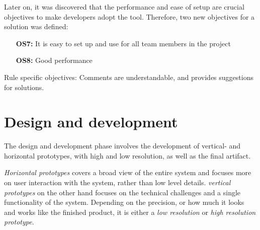 \documentclass{report}
\begin{document}
Later on, it was discovered that the performance and ease of setup are crucial objectives to make developers adopt the tool. Therefore, two new objectives for a solution was defined:
\begin{itemize}
     \item [\textbf{OS7:}] It is easy to set up and use for all team members in the project
    \item [\textbf{OS8:}] Good performance
\end{itemize}






Rule specific objectives: 
Comments are understandable, and provides suggestions for solutions.

\section{Design and development}

The design and development phase involves the development of vertical- and horizontal prototypes, with high and low resolution, as well as the final artifact. 

\textit{Horizontal prototypes} covers a broad view of the entire system and focuses more on user interaction with the system, rather than low level details. \textit{vertical prototypes} on the other hand focuses on the technical challenges and a single functionality of the system. Depending on the precision, or how much it looks and works like the finished product, it is either a \textit{low resolution} or \textit{high resolution prototype}. 
\end{document}
